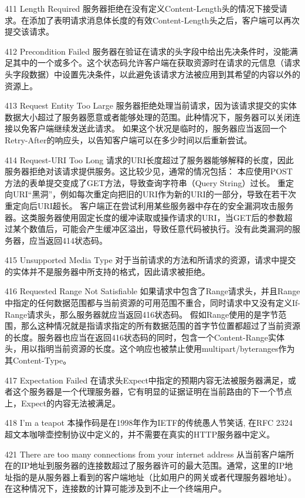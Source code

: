 411 Length Required
服务器拒绝在没有定义Content-Length头的情况下接受请求。在添加了表明请求消息体长度的有效Content-Length头之后，客户端可以再次提交该请求。

412 Precondition Failed
服务器在验证在请求的头字段中给出先决条件时，没能满足其中的一个或多个。这个状态码允许客户端在获取资源时在请求的元信息（请求头字段数据）中设置先决条件，以此避免该请求方法被应用到其希望的内容以外的资源上。

413 Request Entity Too Large
服务器拒绝处理当前请求，因为该请求提交的实体数据大小超过了服务器愿意或者能够处理的范围。此种情况下，服务器可以关闭连接以免客户端继续发送此请求。
如果这个状况是临时的，服务器应当返回一个Retry-After的响应头，以告知客户端可以在多少时间以后重新尝试。

414 Request-URI Too Long
请求的URI长度超过了服务器能够解释的长度，因此服务器拒绝对该请求提供服务。这比较少见，通常的情况包括：
本应使用POST方法的表单提交变成了GET方法，导致查询字符串（Query String）过长。
重定向URI“黑洞”，例如每次重定向把旧的URI作为新的URI的一部分，导致在若干次重定向后URI超长。
客户端正在尝试利用某些服务器中存在的安全漏洞攻击服务器。这类服务器使用固定长度的缓冲读取或操作请求的URI，当GET后的参数超过某个数值后，可能会产生缓冲区溢出，导致任意代码被执行。没有此类漏洞的服务器，应当返回414状态码。

415 Unsupported Media Type
对于当前请求的方法和所请求的资源，请求中提交的实体并不是服务器中所支持的格式，因此请求被拒绝。

416 Requested Range Not Satisfiable
如果请求中包含了Range请求头，并且Range中指定的任何数据范围都与当前资源的可用范围不重合，同时请求中又没有定义If-Range请求头，那么服务器就应当返回416状态码。
假如Range使用的是字节范围，那么这种情况就是指请求指定的所有数据范围的首字节位置都超过了当前资源的长度。服务器也应当在返回416状态码的同时，包含一个Content-Range实体头，用以指明当前资源的长度。这个响应也被禁止使用multipart/byteranges作为其Content-Type。

417 Expectation Failed
在请求头Expect中指定的预期内容无法被服务器满足，或者这个服务器是一个代理服务器，它有明显的证据证明在当前路由的下一个节点上，Expect的内容无法被满足。

418 I'm a teapot
本操作码是在1998年作为IETF的传统愚人节笑话, 在RFC 2324 超文本咖啡壶控制协议中定义的，并不需要在真实的HTTP服务器中定义。

421 There are too many connections from your internet address
从当前客户端所在的IP地址到服务器的连接数超过了服务器许可的最大范围。通常，这里的IP地址指的是从服务器上看到的客户端地址（比如用户的网关或者代理服务器地址）。在这种情况下，连接数的计算可能涉及到不止一个终端用户。

